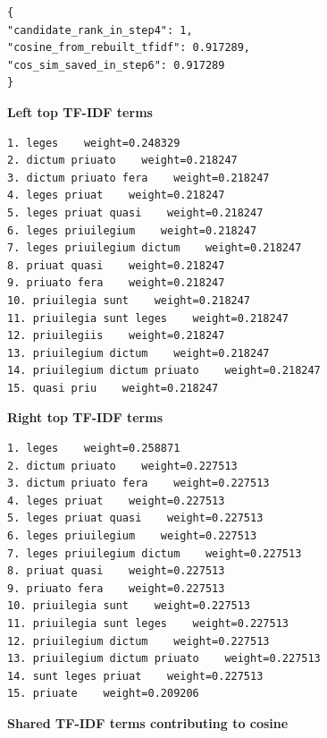 \begin{lstlisting}[breaklines=true,basicstyle=\ttfamily\small,language={}]
{
"candidate_rank_in_step4": 1,
"cosine_from_rebuilt_tfidf": 0.917289,
"cos_sim_saved_in_step6": 0.917289
}
\end{lstlisting}

\textbf{Left top TF-IDF terms} 

\begin{lstlisting}[breaklines=true,basicstyle=\ttfamily\small]
1. leges    weight=0.248329
2. dictum priuato    weight=0.218247
3. dictum priuato fera    weight=0.218247
4. leges priuat    weight=0.218247
5. leges priuat quasi    weight=0.218247
6. leges priuilegium    weight=0.218247
7. leges priuilegium dictum    weight=0.218247
8. priuat quasi    weight=0.218247
9. priuato fera    weight=0.218247
10. priuilegia sunt    weight=0.218247
11. priuilegia sunt leges    weight=0.218247
12. priuilegiis    weight=0.218247
13. priuilegium dictum    weight=0.218247
14. priuilegium dictum priuato    weight=0.218247
15. quasi priu    weight=0.218247
\end{lstlisting}

\textbf{Right top TF-IDF terms} 

\begin{lstlisting}[breaklines=true,basicstyle=\ttfamily\small]
1. leges    weight=0.258871
2. dictum priuato    weight=0.227513
3. dictum priuato fera    weight=0.227513
4. leges priuat    weight=0.227513
5. leges priuat quasi    weight=0.227513
6. leges priuilegium    weight=0.227513
7. leges priuilegium dictum    weight=0.227513
8. priuat quasi    weight=0.227513
9. priuato fera    weight=0.227513
10. priuilegia sunt    weight=0.227513
11. priuilegia sunt leges    weight=0.227513
12. priuilegium dictum    weight=0.227513
13. priuilegium dictum priuato    weight=0.227513
14. sunt leges priuat    weight=0.227513
15. priuate    weight=0.209206
\end{lstlisting}

\textbf{Shared TF-IDF terms contributing to cosine} 

